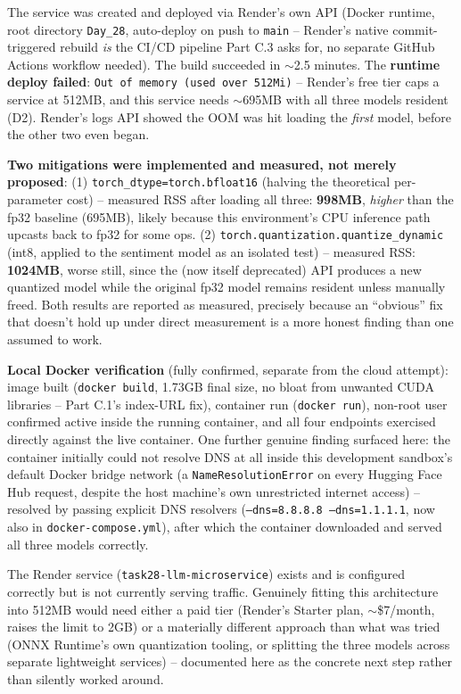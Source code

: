 \documentclass[11pt,a4paper]{article}
\begin{document}
The service was created and deployed via Render's own API (Docker runtime, root directory
\texttt{Day\_28}, auto-deploy on push to \texttt{main} -- Render's native commit-triggered
rebuild \emph{is} the CI/CD pipeline Part C.3 asks for, no separate GitHub Actions workflow
needed). The build succeeded in $\sim$2.5 minutes. The \textbf{runtime deploy failed}:
\texttt{Out of memory (used over 512Mi)} -- Render's free tier caps a service at 512MB, and
this service needs $\sim$695MB with all three models resident (D2). Render's logs API showed
the OOM was hit loading the \emph{first} model, before the other two even began.

\textbf{Two mitigations were implemented and measured, not merely proposed}: (1)
\texttt{torch\_dtype=\allowbreak torch.bfloat16} (halving the theoretical per-parameter cost) --
measured RSS after loading all three: \textbf{998MB}, \emph{higher} than the fp32 baseline
(695MB), likely because this environment's CPU inference path upcasts back to fp32 for some
ops. (2) \texttt{torch.quantization.quantize\_dynamic} (int8, applied to the sentiment model
as an isolated test) -- measured RSS: \textbf{1024MB}, worse still, since the (now itself
deprecated) API produces a new quantized model while the original fp32 model remains
resident unless manually freed. Both results are reported as measured, precisely because an
``obvious'' fix that doesn't hold up under direct measurement is a more honest finding than
one assumed to work.

\textbf{Local Docker verification} (fully confirmed, separate from the cloud attempt): image
built (\texttt{docker build}, 1.73GB final size, no bloat from unwanted CUDA libraries --
Part C.1's index-URL fix), container run (\texttt{docker run}), non-root user confirmed
active inside the running container, and all four endpoints exercised directly against the
live container. One further genuine finding surfaced here: the container initially could not
resolve DNS at all inside this development sandbox's default Docker bridge network (a
\texttt{NameResolutionError} on every Hugging Face Hub request, despite the host machine's
own unrestricted internet access) -- resolved by passing explicit DNS resolvers
(\texttt{--dns=8.8.8.8 --dns=1.1.1.1}, now also in \texttt{docker-compose.yml}), after which
the container downloaded and served all three models correctly.

The Render service (\texttt{task28-llm-microservice}) exists and is configured correctly but
is not currently serving traffic. Genuinely fitting this architecture into 512MB would need
either a paid tier (Render's Starter plan, $\sim$\$7/month, raises the limit to 2GB) or a
materially different approach than what was tried (ONNX Runtime's own quantization tooling,
or splitting the three models across separate lightweight services) -- documented here as the
concrete next step rather than silently worked around.
\end{document}
